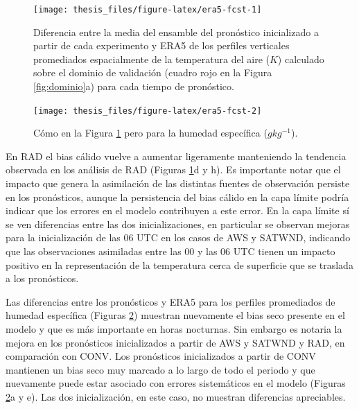 \documentclass[12pt,oneside,a4paper]{reedthesis}
\begin{document}
\begin{figure}[ht]

{\centering \texttt{[image: thesis\_files/figure-latex/era5-fcst-1]} 

}

\caption{Diferencia entre la media del ensamble del pronóstico inicializado a partir de cada experimento y ERA5 de los perfiles verticales promediados espacialmente de la temperatura del aire (\(K\)) calculado sobre el dominio de validación (cuadro rojo en la Figura \ref{fig:dominio}a) para cada tiempo de pronóstico.}\label{fig:era5-fcst-1}
\end{figure}
\begin{figure}[ht]

{\centering \texttt{[image: thesis\_files/figure-latex/era5-fcst-2]} 

}

\caption{Cómo en la Figura \ref{fig:era5-fcst-1} pero para la humedad específica (\(gkg^{-1}\)).}\label{fig:era5-fcst-2}
\end{figure}
En RAD el bias cálido vuelve a aumentar ligeramente manteniendo la tendencia observada en los análisis de RAD (Figuras \ref{fig:era5-fcst-1}d y h). Es importante notar que el impacto que genera la asimilación de las distintas fuentes de observación persiste en los pronósticos, aunque la persistencia del bias cálido en la capa límite podría indicar que los errores en el modelo contribuyen a este error. En la capa límite sí se ven diferencias entre las dos inicializaciones, en particular se observan mejoras para la inicialización de las 06 UTC en los casos de AWS y SATWND, indicando que las observaciones asimiladas entre las 00 y las 06 UTC tienen un impacto positivo en la representación de la temperatura cerca de superficie que se traslada a los pronósticos.

Las diferencias entre los pronósticos y ERA5 para los perfiles promediados de humedad específica (Figuras \ref{fig:era5-fcst-2}) muestran nuevamente el bias seco presente en el modelo y que es más importante en horas nocturnas. Sin embargo es notaria la mejora en los pronósticos inicializados a partir de AWS y SATWND y RAD, en comparación con CONV. Los pronósticos inicializados a partir de CONV mantienen un bias seco muy marcado a lo largo de todo el periodo y que nuevamente puede estar asociado con errores sistemáticos en el modelo (Figuras \ref{fig:era5-fcst-2}a y e). Las dos inicialización, en este caso, no muestran diferencias apreciables.
\end{document}
